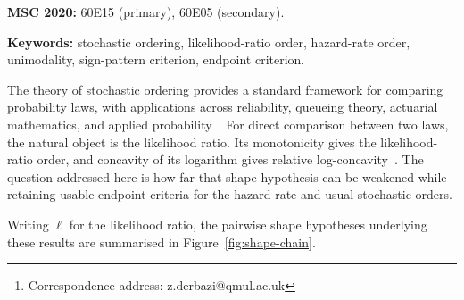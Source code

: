 \documentclass[11pt]{article}
\title{\mytitle}
\author{Zakaria Derbazi\footnote{Correspondence address: z.derbazi@qmul.ac.uk}\\{\it\small Queen Mary University of London}}
\date{\today}
\def\myabstract{

We show that the shape hypothesis on a likelihood ratio can be weakened while retaining endpoint criteria for the hazard-rate and usual stochastic orders. The endpoint reduction persists under unimodality of the likelihood ratio and under a sign-pattern condition on the likelihood ratio minus one, with at most two sign changes and a negative right tail. It also follows from a direct superlevel-set criterion involving the same expression, which is useful in particular for discontinuous likelihood ratios.

}
\begin{document}
\maketitle

\begin{abstract}
\myabstract
\end{abstract}

\medskip\noindent
\textbf{MSC 2020:} 60E15 (primary), 60E05 (secondary).

\medskip\noindent
\textbf{Keywords:} stochastic ordering, likelihood-ratio order, hazard-rate order, unimodality, sign-pattern criterion, endpoint criterion.






The theory of stochastic ordering provides a standard framework for comparing probability laws, with applications across reliability, queueing theory, actuarial mathematics, and applied probability~\cite{ShakedShanthikumar,MullerStoyan}. For direct comparison between two laws, the natural object is the likelihood ratio. Its monotonicity gives the likelihood-ratio order, and concavity of its logarithm gives relative log-concavity~\cite{Whitt1985,Yu2009}. The question addressed here is how far that shape hypothesis can be weakened while retaining usable endpoint criteria for the hazard-rate and usual stochastic orders.

Writing $\ell$ for the likelihood ratio, the pairwise shape hypotheses underlying these results are summarised in Figure~\ref{fig:shape-chain}.
\end{document}
